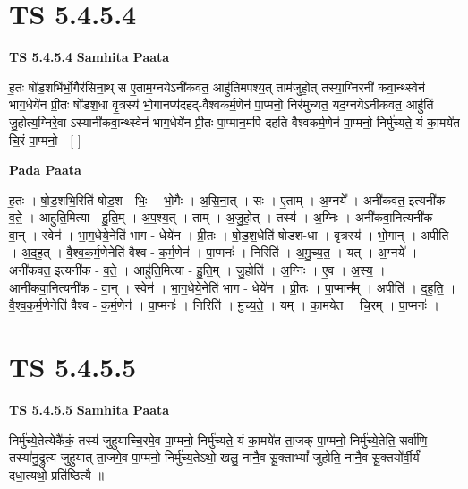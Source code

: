 \documentclass[17pt]{extarticle}
\begin{document}
\section*{ TS 5.4.5.4 }

\textbf{TS 5.4.5.4 } \newline
\textbf{Samhita Paata} \newline

ह॒तः षो॑ड॒शभि॑र्भो॒गैर॑सिना॒थ् स ए॒ताम॒ग्नयेऽनी॑कवत॒ आहु॑तिमपश्य॒त् ताम॑जुहो॒त् तस्या॒ग्निरनी॑ कवा॒न्थ्स्वेन॑ भाग॒धेये॑न प्री॒तः षो॑डश॒धा वृ॒त्रस्य॑ भो॒गानप्य॑दहद्-वैश्वकर्म॒णेन॑ पा॒प्मनो॒ निर॑मुच्यत॒ यद॒ग्नयेऽनी॑कवत॒ आहु॑तिं जु॒होत्य॒ग्निरे॒वा-ऽस्यानी॑कवा॒न्थ्स्वेन॑ भाग॒धेये॑न प्री॒तः पा॒प्मान॒मपि॑ दहति वैश्वकर्म॒णेन॑ पा॒प्मनो॒ निर्मु॑च्यते॒ यं का॒मये॑त चि॒रं पा॒प्मनो॒ - [  ] \newline

\textbf{Pada Paata} \newline

ह॒तः । षो॒ड॒शभि॒रिति॑ षोड॒श - भिः॒ । भो॒गैः । अ॒सि॒ना॒त् । सः । ए॒ताम् । अ॒ग्नये᳚ । अनी॑कवत॒ इत्यनी॑क - व॒ते॒ । आहु॑ति॒मित्या - हु॒ति॒म् । अ॒प॒श्य॒त् । ताम् । अ॒जु॒हो॒त् । तस्य॑ । अ॒ग्निः । अनी॑कवा॒नित्यनी॑क - वा॒न् । स्वेन॑ । भा॒ग॒धेये॒नेति॑ भाग - धेये॑न । प्री॒तः । षो॒ड॒श॒धेति॑ षोडश-धा । वृ॒त्रस्य॑ । भो॒गान् । अपीति॑ । अ॒द॒ह॒त् । वै॒श्व॒क॒र्म॒णेनेति॑ वैश्व - क॒र्म॒णेन॑ । पा॒प्मनः॑ । निरिति॑ । अ॒मु॒च्य॒त॒ । यत् । अ॒ग्नये᳚ । अनी॑कवत॒ इत्यनी॑क - व॒ते॒ । आहु॑ति॒मित्या - हु॒ति॒म् । जु॒होति॑ । अ॒ग्निः । ए॒व । अ॒स्य॒ । आनी॑कवा॒नित्यनी॑क - वा॒न् । स्वेन॑ । भा॒ग॒धेये॒नेति॑ भाग - धेये॑न । प्री॒तः । पा॒प्मान᳚म् । अपीति॑ । द॒ह॒ति॒ । वै॒श्व॒क॒र्म॒णेनेति॑ वैश्व - क॒र्म॒णेन॑ । पा॒प्मनः॑ । निरिति॑ । मु॒च्य॒ते॒ । यम् । का॒मये॑त । चि॒रम् । पा॒प्मनः॑ ।  \newline




\section*{ TS 5.4.5.5 }

\textbf{TS 5.4.5.5 } \newline
\textbf{Samhita Paata} \newline

निर्मु॑च्ये॒तेत्येकै॑कं॒ तस्य॑ जुहुयाच्चि॒रमे॒व पा॒प्मनो॒ निर्मु॑च्यते॒ यं का॒मये॑त ता॒जक् पा॒प्मनो॒ निर्मु॑च्ये॒तेति॒ सर्वा॑णि॒ तस्या॑नु॒द्रुत्य॑ जुहुयात् ता॒जगे॒व पा॒प्मनो॒ निर्मु॑च्य॒तेऽथो॒ खलु॒ नानै॒व सू॒क्ताभ्यां᳚ जुहोति॒ नानै॒व सू॒क्तयो᳚र्वी॒र्यं॑ दधा॒त्यथो॒ प्रति॑ष्ठित्यै ॥ \newline
\end{document}
